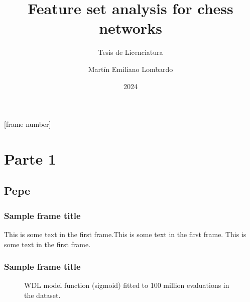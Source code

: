 \usepackage{../common}

\title{Feature set analysis for chess  networks}
\subtitle{Tesis de Licenciatura}
\author{Martín Emiliano Lombardo}
\date{2024}

[frame number]{}



\frame{\titlepage}

\section{Parte 1}

\subsection{Pepe}

\begin{frame}
\frametitle{Sample frame title}
This is some text in the first frame.\pause This is some text in the first frame. This is some text in the first frame.
\end{frame}

\begin{frame}
\frametitle{Sample frame title}

\begin{figure}[H]
\centering
{}
\caption{WDL model function (sigmoid) fitted to 100 million evaluations in the dataset.}
\label{wdl-fit}
\end{figure}

\end{frame}

